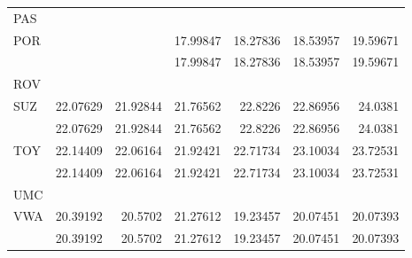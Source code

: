 \begin{tabular}{lrrrrrr}
PAS &  &  &  &  &  &  \\
POR &  &  & 17.99847 & 18.27836 & 18.53957 & 19.59671 \\
 &  &  & 17.99847 & 18.27836 & 18.53957 & 19.59671 \\
ROV &  &  &  &  &  &  \\
SUZ & 22.07629 & 21.92844 & 21.76562 & 22.8226 & 22.86956 & 24.0381 \\
 & 22.07629 & 21.92844 & 21.76562 & 22.8226 & 22.86956 & 24.0381 \\
TOY & 22.14409 & 22.06164 & 21.92421 & 22.71734 & 23.10034 & 23.72531 \\
 & 22.14409 & 22.06164 & 21.92421 & 22.71734 & 23.10034 & 23.72531 \\
UMC &  &  &  &  &  &  \\
VWA & 20.39192 & 20.5702 & 21.27612 & 19.23457 & 20.07451 & 20.07393 \\
 & 20.39192 & 20.5702 & 21.27612 & 19.23457 & 20.07451 & 20.07393 \\
\bottomrule
\end{tabular}
